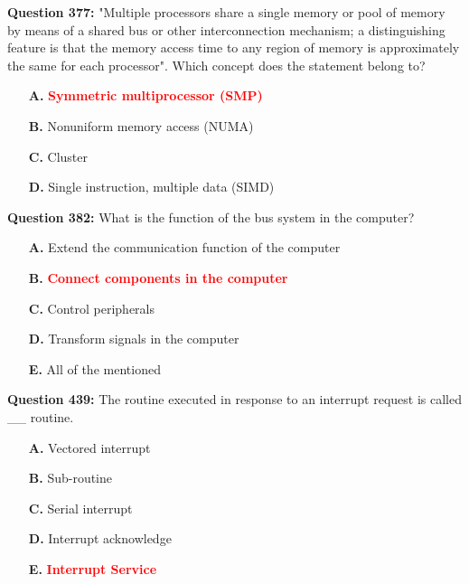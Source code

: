 \documentclass[12pt,a4paper]{article}
\begin{document}
\textbf{Question 377:} "Multiple processors share a single memory or pool of memory by means of a shared bus or other interconnection mechanism; a distinguishing feature is that the memory access time to any region of memory is approximately the same for each processor". Which concept does the statement belong to?

\begin{itemize}
    \item[\textbf{A.}] \textcolor{red}{\textbf{Symmetric multiprocessor (SMP)}}
    \item[\textbf{B.}] Nonuniform memory access (NUMA)
    \item[\textbf{C.}] Cluster
    \item[\textbf{D.}] Single instruction, multiple data (SIMD)
\end{itemize}

\vspace{0.5cm}

\textbf{Question 382:} What is the function of the bus system in the computer?

\begin{itemize}
    \item[\textbf{A.}] Extend the communication function of the computer
    \item[\textbf{B.}] \textcolor{red}{\textbf{Connect components in the computer}}
    \item[\textbf{C.}] Control peripherals
    \item[\textbf{D.}] Transform signals in the computer
    \item[\textbf{E.}] All of the mentioned
\end{itemize}

\vspace{0.5cm}

\textbf{Question 439:} The routine executed in response to an interrupt request is called __ routine.

\begin{itemize}
    \item[\textbf{A.}] Vectored interrupt
    \item[\textbf{B.}] Sub-routine
    \item[\textbf{C.}] Serial interrupt
    \item[\textbf{D.}] Interrupt acknowledge
    \item[\textbf{E.}] \textcolor{red}{\textbf{Interrupt Service}}
\end{itemize}

\vspace{0.5cm}
\end{document}
